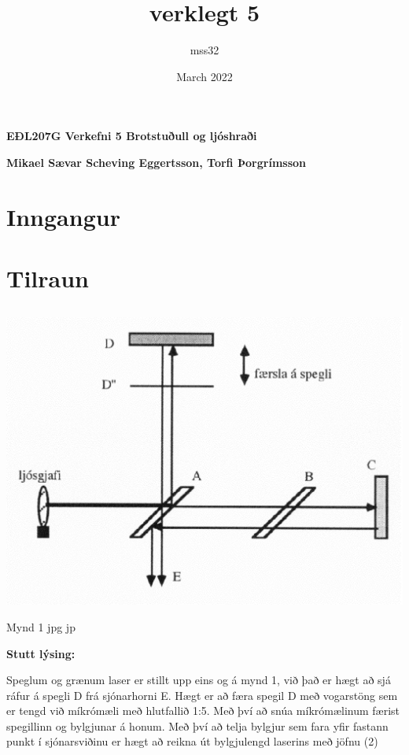 \documentclass[12pt]{article}
\title{verklegt 5}
\author{mss32 }
\date{March 2022}
\begin{document}
\centerline{\bf \Huge EÐL207G Verkefni 5 Brotstuðull og ljóshraði}
\centerline{\bf Mikael Sævar Scheving Eggertsson, Torfi Þorgrímsson}

\centerline{\bf \large }

\tableofcontents
\newpage

\section{Inngangur}


\section{Tilraun}
\subsection{}

\setlength{\parindent}{0pt}



\begin{center}
    \includegraphics[scale=0.4]{mynd1}

Mynd 1 jpg jp
\end{center}

\textbf{Stutt lýsing:}


Speglum og grænum laser er stillt upp eins og á mynd 1, við það er hægt að sjá ráfur á spegli D frá sjónarhorni E. 
Hægt er að færa spegil D með vogarstöng sem er tengd við míkrómæli með hlutfallið 1:5. Með því að snúa míkrómælinum
færist spegillinn og bylgjunar á honum. Með því að telja bylgjur sem fara yfir fastann punkt í sjónarsviðinu er 
hægt að reikna út bylgjulengd laserins með jöfnu (2)
\end{document}
